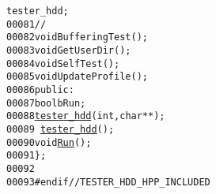\begin{footnotesize}
\begin{alltt}
      tester\_hdd; 
00081         \textcolor{comment}{//}
00082         \textcolor{keywordtype}{void} BufferingTest();
00083         \textcolor{keywordtype}{void} GetUserDir();
00084         \textcolor{keywordtype}{void} SelfTest();
00085         \textcolor{keywordtype}{void} UpdateProfile();
00086     \textcolor{keyword}{public}:
00087         \textcolor{keywordtype}{bool} bRun;
00088         \hyperlink{classtester__hdd_af43b8ca9595ed8ebf14b2c7cffe561c2}{tester_hdd}(\textcolor{keywordtype}{int},\textcolor{keywordtype}{char} **);
00089         ~\hyperlink{classtester__hdd}{tester_hdd}();
00090         \textcolor{keywordtype}{void} \hyperlink{classtester__hdd_abfdcc395e8be504dfd0ea686da790375}{Run}();
00091 \};
00092 
00093 \textcolor{preprocessor}{#endif // TESTER\_HDD\_HPP\_INCLUDED}
\end{alltt}\end{footnotesize}
